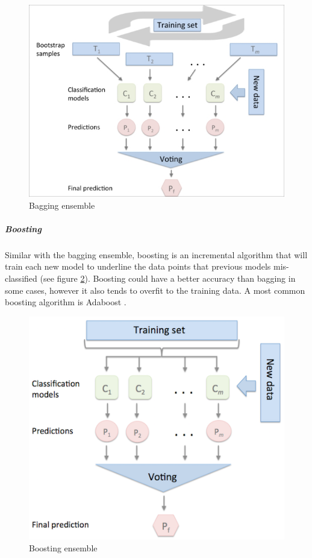 \begin{figure}
\includegraphics[scale=0.4]{Images/bagging.jpg}
\centering
\caption{Bagging ensemble \citep{raschka2015python}}
\label{img:bagging_ensemble}
\end{figure}


\subparagraph{Boosting}

Similar with the bagging ensemble, boosting is an incremental algorithm that will train each new model to underline the data points that previous models mis-classified (see figure \ref{img:boosting_ensemble}). Boosting could have a better accuracy than bagging in some cases, however it also tends to overfit to the training data. A most common boosting algorithm is Adaboost \citep{freund1999short}.


\begin{figure}
\includegraphics[scale=0.4]{Images/boosting.png}
\centering
\caption{Boosting ensemble \citep{raschka2015python}}
\label{img:boosting_ensemble}
\end{figure}


